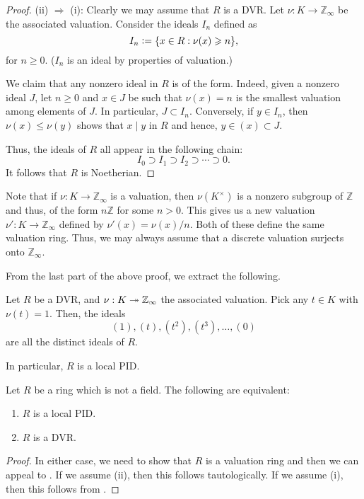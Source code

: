 \documentclass[12pt]{article}
\begin{document}
\begin{proof}
	(ii) $\Rightarrow$ (i): Clearly we may assume that $R$ is a DVR. Let $\nu : K \to \mathbb{Z}_{\infty}$ be the associated valuation. Consider the ideals $I_{n}$ defined as
	\begin{equation*} 
		I_{n} \vcentcolon= \{x \in R : \nu(x) \ge n\},
	\end{equation*}
	for $n \ge 0$. ($I_{n}$ is an ideal by properties of valuation.)

	We claim that any nonzero ideal in $R$ is of the form. Indeed, given a nonzero ideal $J$, let $n \ge 0$ and $x \in J$ be such that $\nu(x) = n$ is the smallest valuation among elements of $J$. \newline
	In particular, $J \subset I_{n}$. Conversely, if $y \in I_{n}$, then $\nu(x) \le \nu(y)$ shows that $x \mid y$ in $R$ and hence, $y \in (x) \subset J$.

	Thus, the ideals of $R$ all appear in the following chain:
	\begin{equation*} 
		I_{0} \supset I_{1} \supset I_{2} \supset \cdots \supset 0.
	\end{equation*}
	It follows that $R$ is Noetherian.
\end{proof}

Note that if $\nu : K \to \mathbb{Z}_{\infty}$ is a valuation, then $\nu(K^{\times})$ is a nonzero subgroup of $\mathbb{Z}$ and thus, of the form $n \mathbb{Z}$ for some $n > 0$. This gives us a new valuation $\nu' : K \to \mathbb{Z}_{\infty}$ defined by $\nu'(x) = \nu(x)/n$. \newline
Both of these define the same valuation ring. Thus, we may always assume that a discrete valuation surjects onto $\mathbb{Z}_{\infty}$.

From the last part of the above proof, we extract the following.

\begin{por}
	Let $R$ be a DVR, and $\nu : K \onto \mathbb{Z}_{\infty}$ the associated valuation. \newline
	Pick any $t \in K$ with $\nu(t) = 1$. Then, the ideals
	\begin{equation*} 
		(1), (t), (t^{2}), (t^{3}), \ldots, (0)
	\end{equation*}
	are all the distinct ideals of $R$. 

	In particular, $R$ is a local PID.
\end{por}

\begin{cor} \label{cor:local-PID-DVR}
	Let $R$ be a ring which is not a field. The following are equivalent:
	\begin{enumerate}[label=(\roman*)]
		\item $R$ is a local PID.
		\item $R$ is a DVR.
	\end{enumerate}
\end{cor}
\begin{proof} 
	In either case, we need to show that $R$ is a valuation ring and then we can appeal to . If we assume (ii), then this follows tautologically. If we assume (i), then this follows from .
\end{proof}
\end{document}
